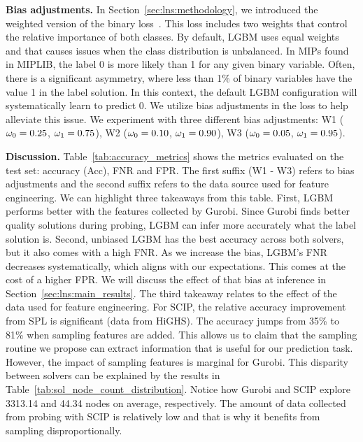 \documentclass[3p, authoryear, times]{elsarticle}
\begin{document}
\textbf{Bias adjustments. } In Section~\ref{sec:lns:methodology}, we introduced the weighted version of the binary loss~. This loss includes two weights that control the relative importance of both classes. By default, LGBM uses equal weights and that causes issues when the class distribution is unbalanced. In MIPs found in MIPLIB, the label 0 is more likely than 1 for any given binary variable.  Often, there is a significant asymmetry, where less than 1\% of binary variables have the value 1 in the label solution. In this context, the default LGBM configuration will systematically learn to predict 0. We utilize bias adjustments in the loss to help alleviate this issue. We experiment with three different bias adjustments: W1 ($\omega_0 = 0.25$, $\omega_1=0.75$), W2 ($\omega_0 = 0.10$, $\omega_1=0.90$), W3 ($\omega_0 = 0.05$, $\omega_1=0.95$). 


\textbf{Discussion. } Table~\ref{tab:accuracy_metrics} shows the metrics evaluated on the test set: accuracy (Acc), FNR and FPR. The first suffix (W1 - W3) refers to bias adjustments and the second suffix refers to the data source used for feature engineering. We can highlight three takeaways from this table. First, LGBM performs better with the features collected by Gurobi. Since Gurobi finds better quality solutions during probing, LGBM can infer more accurately what the label solution is. Second, unbiased LGBM has the best accuracy across both solvers, but it also comes with a high FNR. As we increase the bias, LGBM's FNR decreases systematically, which aligns with our expectations. This comes at the cost of a higher FPR. We will discuss the effect of that bias at inference in Section~\ref{sec:lns:main_results}.  The third takeaway relates to the effect of the data used for feature engineering. For SCIP, the relative accuracy improvement from SPL is significant (data from HiGHS). The accuracy jumps from 35\% to 81\% when sampling features are added. This allows us to claim that the sampling routine we propose can extract information that is useful for our prediction task. However, the impact of sampling features is marginal for Gurobi. This disparity between solvers can be explained by the results in Table~\ref{tab:sol_node_count_distribution}. Notice how Gurobi and SCIP explore 3313.14 and 44.34 nodes on average, respectively. The amount of data collected from probing with SCIP is relatively low and that is why it benefits from sampling disproportionally. 
\end{document}
